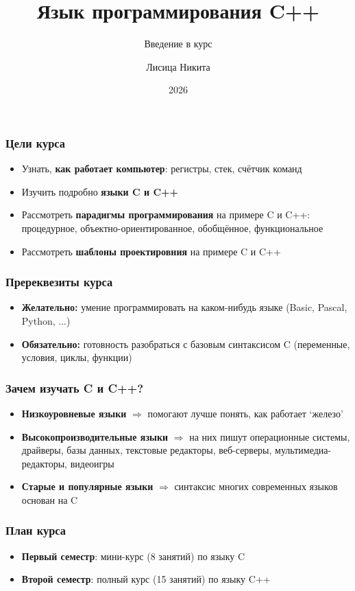 \documentclass[10pt]{beamer}
\title{Язык программирования C++}
\subtitle{Введение в курс}
\author{Лисица Никита}
\date{2026}
\begin{document}
\frame{\titlepage}

\begin{frame}[fragile]
\frametitle{Цели курса}
\begin{itemize}
\item Узнать, \textbf{как работает компьютер}: регистры, стек, счётчик команд
\pause
\item Изучить подробно \textbf{языки C и C++}
\pause
\item Рассмотреть \textbf{парадигмы программирования} на примере C и C++: процедурное, объектно-ориентированное, обобщённое, функциональное
\pause
\item Рассмотреть \textbf{шаблоны проектировния} на примере C и C++
\end{itemize}
\end{frame}

\begin{frame}[fragile]
\frametitle{Пререквезиты курса}
\begin{itemize}
\item \textbf{Желательно:} умение программировать на каком-нибудь языке (Basic, Pascal, Python, ...)
\pause
\item \textbf{Обязательно:} готовность разобраться с базовым синтаксисом C (переменные, условия, циклы, функции)
\end{itemize}
\end{frame}

\begin{frame}[fragile]
\frametitle{Зачем изучать C и C++?}
\begin{itemize}
\item \textbf{Низкоуровневые языки} \(\Longrightarrow\) помогают лучше понять, как работает `железо'
\pause
\item \textbf{Высокопроизводительные языки} \(\Longrightarrow\) на них пишут операционные системы, драйверы, базы данных, текстовые редакторы, веб-серверы, мультимедиа-редакторы, видеоигры
\pause
\item \textbf{Старые и популярные языки} \(\Longrightarrow\) синтаксис многих современных языков основан на C
\end{itemize}
\end{frame}

\begin{frame}[fragile]
\frametitle{План курса}
\begin{itemize}
\item \textbf{Первый семестр}: мини-курс (8 занятий) по языку C
\pause
\item \textbf{Второй семестр}: полный курс (15 занятий) по языку C++
\end{itemize}
\end{frame}
\end{document}
